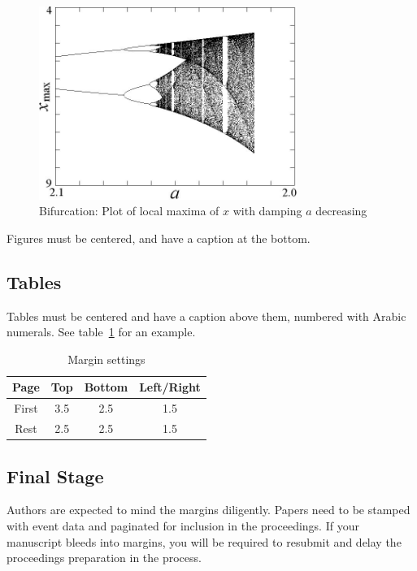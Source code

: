 \documentclass{ifacconf}
\begin{document}
\begin{figure}
\begin{center}
\includegraphics[width=8.4cm]{bifurcation}    %
\caption{Bifurcation: Plot of local maxima of $x$ with damping $a$ decreasing} 
\label{fig:bifurcation}
\end{center}
\end{figure}

Figures must be centered, and have a caption at the bottom. 

\subsection{Tables}
Tables must be centered and have a caption above them, numbered with
Arabic numerals. See table~\ref{tb:margins} for an example.

\begin{table}[hb]
\begin{center}
\caption{Margin settings}\label{tb:margins}
\begin{tabular}{cccc}
Page & Top & Bottom & Left/Right \\\hline
First & 3.5 & 2.5 & 1.5 \\
Rest & 2.5 & 2.5 & 1.5 \\ \hline
\end{tabular}
\end{center}
\end{table}

\subsection{Final Stage}

Authors are expected to mind the margins diligently.  Papers need to
be stamped with event data and paginated for inclusion in the
proceedings. If your manuscript bleeds into margins, you will be
required to resubmit and delay the proceedings preparation in the
process.
\end{document}
